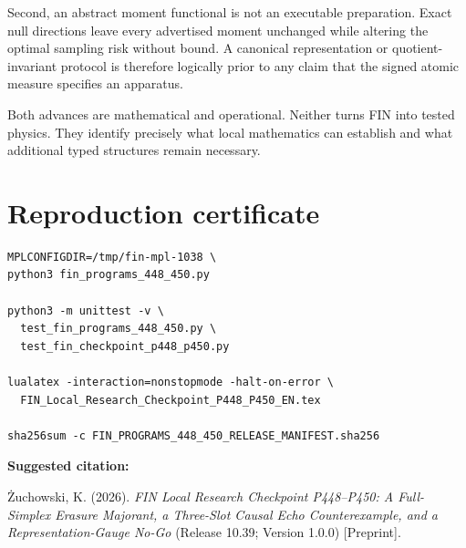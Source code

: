 \documentclass[11pt,a4paper,openany]{report}
\begin{document}
Second, an abstract moment functional is not an executable preparation. Exact null directions leave every advertised moment unchanged while altering the optimal sampling risk without bound. A canonical representation or quotient-invariant protocol is therefore logically prior to any claim that the signed atomic measure specifies an apparatus.

Both advances are mathematical and operational. Neither turns FIN into tested physics. They identify precisely what local mathematics can establish and what additional typed structures remain necessary.


\clearpage
\chapter*{Reproduction certificate}
\begin{Verbatim}[fontsize=\small]
MPLCONFIGDIR=/tmp/fin-mpl-1038 \
python3 fin_programs_448_450.py

python3 -m unittest -v \
  test_fin_programs_448_450.py \
  test_fin_checkpoint_p448_p450.py

lualatex -interaction=nonstopmode -halt-on-error \
  FIN_Local_Research_Checkpoint_P448_P450_EN.tex

sha256sum -c FIN_PROGRAMS_448_450_RELEASE_MANIFEST.sha256
\end{Verbatim}

\noindent\textbf{Suggested citation:}

\.Zuchowski, K. (2026). \emph{FIN Local Research Checkpoint P448--P450:
A Full-Simplex Erasure Majorant, a Three-Slot Causal Echo Counterexample,
and a Representation-Gauge No-Go} (Release 10.39; Version 1.0.0) [Preprint].
\end{document}
